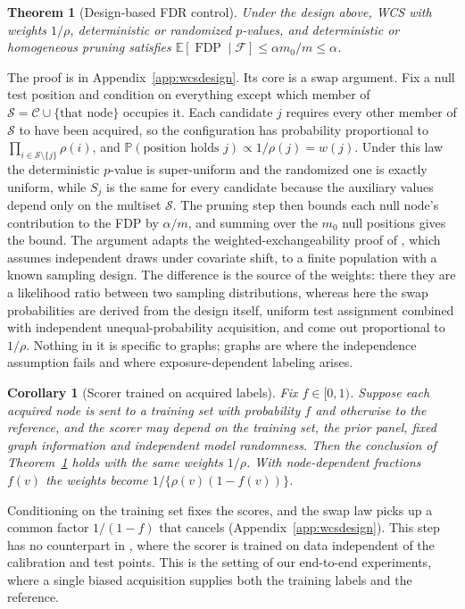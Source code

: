 \documentclass[twoside]{article}
\newtheorem{theorem}{Theorem}
\newtheorem{corollary}{Corollary}
\newcommand{\FDP}{\operatorname{FDP}}
\newcommand{\Prb}{\mathbb{P}}
\newcommand{\E}{\mathbb{E}}
\newcommand{\calset}{\mathcal{C}}
\begin{document}
\begin{theorem}[Design-based FDR control]
\label{thm:design}
Under the design above, WCS with weights $1/\rho$, deterministic or randomized $p$-values, and deterministic or homogeneous pruning satisfies $\E[\FDP\mid\mathcal F]\le\alpha m_0/m\le\alpha$.
\end{theorem}
The proof is in Appendix~\ref{app:wcsdesign}. Its core is a swap argument. Fix a null test position and condition on everything except which member of $\mathcal S=\calset\cup\{\text{that node}\}$ occupies it. Each candidate $j$ requires every other member of $\mathcal S$ to have been acquired, so the configuration has probability proportional to $\prod_{i\in\mathcal S\setminus\{j\}}\rho(i)$, and $\Prb(\text{position holds }j)\propto1/\rho(j)=w(j)$. Under this law the deterministic $p$-value is super-uniform and the randomized one is exactly uniform, while $S_j$ is the same for every candidate because the auxiliary values depend only on the multiset $\mathcal S$. The pruning step then bounds each null node's contribution to the FDP by $\alpha/m$, and summing over the $m_0$ null positions gives the bound. The argument adapts the weighted-exchangeability proof of \citet{jin2026weighted}, which assumes independent draws under covariate shift, to a finite population with a known sampling design. The difference is the source of the weights: there they are a likelihood ratio between two sampling distributions, whereas here the swap probabilities are derived from the design itself, uniform test assignment combined with independent unequal-probability acquisition, and come out proportional to $1/\rho$. Nothing in it is specific to graphs; graphs are where the independence assumption fails and where exposure-dependent labeling arises.

\begin{corollary}[Scorer trained on acquired labels]
\label{cor:trained}
Fix $f\in[0,1)$. Suppose each acquired node is sent to a training set with probability $f$ and otherwise to the reference, and the scorer may depend on the training set, the prior panel, fixed graph information and independent model randomness. Then the conclusion of Theorem~\ref{thm:design} holds with the same weights $1/\rho$. With node-dependent fractions $f(v)$ the weights become $1/\{\rho(v)(1-f(v))\}$.
\end{corollary}
Conditioning on the training set fixes the scores, and the swap law picks up a common factor $1/(1-f)$ that cancels (Appendix~\ref{app:wcsdesign}). This step has no counterpart in \citet{jin2026weighted}, where the scorer is trained on data independent of the calibration and test points. This is the setting of our end-to-end experiments, where a single biased acquisition supplies both the training labels and the reference.
\end{document}
